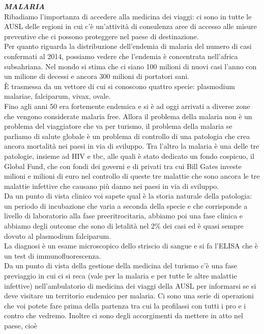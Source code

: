 \documentclass[]{article}
\begin{document}
\textbf{\emph{MALARIA\\
}}Ribadiamo l'importanza di accedere alla medicina dei viaggi: ci sono
in tutte le AUSL delle regioni in cui c'è un'attività di consulenza aree
di accesso alle misure preventive che ci possono proteggere nel paese di
destinazione.\\
Per quanto riguarda la distribuzione dell'endemia di malaria del numero
di casi confermati al 2014, possiamo vedere che l'endemia è concentrata
nell'africa subsahriana. Nel mondo si stima che ci siano 100 milioni di
nuovi casi l'anno con un milione di decessi e ancora 300 milioni di
portatori sani.\\
È trasmessa da un vettore di cui si conoscono quattro specie: plasmodium
malariae, falciparum, vivax, ovale.\\
Fino agli anni 50 era fortemente endemica e si è ad oggi arrivati a
diverse zone che vengono considerate malaria free. Allora il problema
della malaria non è un problema del viaggiatore che va per turismo, il
problema della malaria se parliamo di salute globale è un problema di
controllo di una patologia che crea ancora mortalità nei paesi in via di
sviluppo. Tra l'altro la malaria è una delle tre patologie, insieme ad
HIV e tbc, alle quali è stato dedicato un fondo cospicuo, il Global
Fund, che con fondi dei governi e di privati tra cui Bill Gates investe
milioni e milioni di euro nel controllo di queste tre malattie che sono
ancora le tre malattie infettive che causano più danno nei paesi in via
di sviluppo.\\
Da un punto di vista clinico voi sapete qual è la storia naturale della
patologia: un periodo di incubazione che varia a seconda della specie e
che corrisponde a livello di laboratorio alla fase preeritrocitaria,
abbiamo poi una fase clinica e abbiamo degli outcome che sono di
letalità nel 2\% dei casi ed è quasi sempre dovuto al plasmodium
falciparum.\\
La diagnosi è un esame microscopico dello striscio di sangue e si fa
l'ELISA che è un test di immunofluorescenza.\\
Da un punto di vista della gestione della medicina del turismo c'è una
fase previaggio in cui ci si reca (vale per la malaria e per tutte le
altre malattie infettive) nell'ambulatorio di medicina dei viaggi della
AUSL per informarsi se si deve visitare un territorio endemico per
malaria. Ci sono una serie di operazioni che voi potete fare prima della
partenza tra cui la profilassi con tutti i pro e i contro che vedremo.
Inoltre ci sono degli accorgimenti da mettere in atto nel paese, cioè
\end{document}
